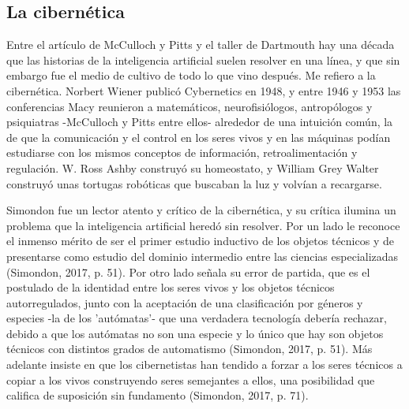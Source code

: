 \subsection{La cibernética}

Entre el artículo de McCulloch y Pitts y el taller de Dartmouth hay una década que las historias de la inteligencia artificial suelen resolver en una línea, y que sin embargo fue el medio de cultivo de todo lo que vino después. Me refiero a la cibernética. Norbert Wiener publicó Cybernetics en 1948, y entre 1946 y 1953 las conferencias Macy reunieron a matemáticos, neurofisiólogos, antropólogos y psiquiatras -McCulloch y Pitts entre ellos- alrededor de una intuición común, la de que la comunicación y el control en los seres vivos y en las máquinas podían estudiarse con los mismos conceptos de información, retroalimentación y regulación. W. Ross Ashby construyó su homeostato, y William Grey Walter construyó unas tortugas robóticas que buscaban la luz y volvían a recargarse.

Simondon fue un lector atento y crítico de la cibernética, y su crítica ilumina un problema que la inteligencia artificial heredó sin resolver. Por un lado le reconoce el inmenso mérito de ser el primer estudio inductivo de los objetos técnicos y de presentarse como estudio del dominio intermedio entre las ciencias especializadas (Simondon, 2017, p. 51). Por otro lado señala su error de partida, que es el postulado de la identidad entre los seres vivos y los objetos técnicos autorregulados, junto con la aceptación de una clasificación por géneros y especies -la de los 'autómatas'- que una verdadera tecnología debería rechazar, debido a que los autómatas no son una especie y lo único que hay son objetos técnicos con distintos grados de automatismo (Simondon, 2017, p. 51). Más adelante insiste en que los cibernetistas han tendido a forzar a los seres técnicos a copiar a los vivos construyendo seres semejantes a ellos, una posibilidad que califica de suposición sin fundamento (Simondon, 2017, p. 71).

